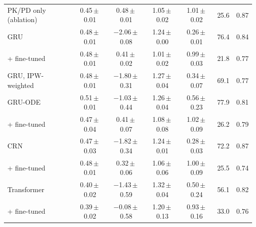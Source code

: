 \begin{tabular}{lcccccc}
PK/PD only (ablation) & 0.45\,$\pm$\,0.01 & 0.48\,$\pm$\,0.01 & 1.05\,$\pm$\,0.02 & 1.01\,$\pm$\,0.02 & 25.6 & 0.87 \\
GRU & 0.48\,$\pm$\,0.01 & $-$2.06\,$\pm$\,0.08 & 1.24\,$\pm$\,0.00 & 0.26\,$\pm$\,0.01 & 76.4 & 0.84 \\
\quad + fine-tuned & 0.48\,$\pm$\,0.01 & 0.41\,$\pm$\,0.02 & 1.01\,$\pm$\,0.02 & 0.99\,$\pm$\,0.03 & 21.8 & 0.77 \\
GRU, IPW-weighted & 0.48\,$\pm$\,0.01 & $-$1.80\,$\pm$\,0.31 & 1.27\,$\pm$\,0.04 & 0.34\,$\pm$\,0.07 & 69.1 & 0.77 \\
GRU-ODE & 0.51\,$\pm$\,0.01 & $-$1.03\,$\pm$\,0.44 & 1.26\,$\pm$\,0.04 & 0.56\,$\pm$\,0.23 & 77.9 & 0.81 \\
\quad + fine-tuned & 0.47\,$\pm$\,0.04 & 0.41\,$\pm$\,0.07 & 1.08\,$\pm$\,0.08 & 1.02\,$\pm$\,0.09 & 26.2 & 0.79 \\
CRN & 0.47\,$\pm$\,0.03 & $-$1.82\,$\pm$\,0.34 & 1.24\,$\pm$\,0.01 & 0.28\,$\pm$\,0.03 & 72.2 & 0.87 \\
\quad + fine-tuned & 0.48\,$\pm$\,0.01 & 0.32\,$\pm$\,0.06 & 1.06\,$\pm$\,0.06 & 1.00\,$\pm$\,0.09 & 25.5 & 0.74 \\
Transformer & 0.40\,$\pm$\,0.02 & $-$1.43\,$\pm$\,0.59 & 1.32\,$\pm$\,0.04 & 0.50\,$\pm$\,0.24 & 56.1 & 0.82 \\
\quad + fine-tuned & 0.39\,$\pm$\,0.02 & $-$0.08\,$\pm$\,0.58 & 1.20\,$\pm$\,0.13 & 0.93\,$\pm$\,0.16 & 33.0 & 0.76 \\
\bottomrule
\end{tabular}
